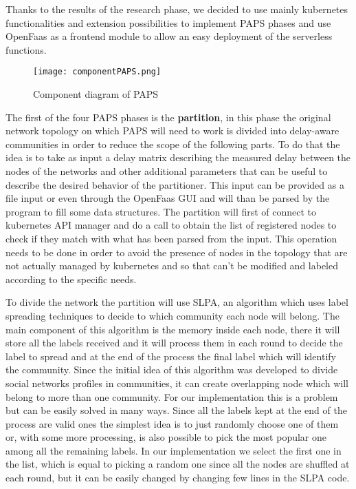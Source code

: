 Thanks to the results of the research phase, we decided to use mainly kubernetes functionalities
and extension possibilities to implement PAPS phases and use OpenFaas as a frontend module to 
allow an easy deployment of the serverless functions.
\begin{figure}[h]
    \texttt{[image: componentPAPS.png]}
    \label{fig:component}
    \caption{Component diagram of PAPS}
\end{figure}

The first of the four PAPS phases is the \textbf{partition}, in this phase the original 
network topology on which PAPS will need to work is divided into delay-aware communities in 
order to reduce the scope of the following parts. To do that the idea is to take as input a 
delay matrix describing the measured delay between the nodes of the networks and other 
additional parameters that can be useful to describe the desired behavior of the partitioner.
This input can be provided as a file input or even through the OpenFaas GUI and will than be
parsed by the program to fill some data structures. The partition will first of connect to 
kubernetes API manager and do a call to obtain the list of registered nodes to check if they 
match with what has been parsed from the input. This operation needs to be done in order to
avoid the presence of nodes in the topology that are not actually managed by kubernetes and 
so that can't be modified and labeled according to the specific needs. 

To divide the network the partition will use SLPA, an algorithm which uses label spreading 
techniques to decide to which community each node will belong. The main component of this 
algorithm is the memory inside each node, there it will store all the labels received and 
it will process them in each round to decide the label to spread and at the end of the 
process the final label which will identify the community. Since the initial idea of this 
algorithm was developed to divide social networks profiles in communities, it can create 
overlapping node which will belong to more than one community. For our implementation this
is a problem but can be easily solved in many ways. Since all the labels kept at the end 
of the process are valid ones the simplest idea is to just randomly choose one of them or,
with some more processing, is also possible to pick the most popular one among all the 
remaining labels. In our implementation we select the first one in the list, which is 
equal to picking a random one since all the nodes are shuffled at each round, but it can 
be easily changed by changing few lines in the SLPA code.

